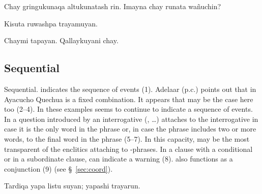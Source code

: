 %
{Chay gringukunaqa altukunatash rin. \textquestiondown{}Imayna chay runata wa\~nuchin?}%
{}%
{}{}%

%
{Kisuta ruwashpa trayamuyan.}%
{}%
{}{}%

%
{Chaymi tapayan. Qallaykuyani chay.}%
{}%
{}{}%

\subsection{Sequential }
Sequential.  indicates the sequence of events (1). Adelaar (p.c.) points out that in Ayacucho Quechua  is a fixed combination. It appears that may be the case here too (2--4). In these examples  seems to continue to indicate a sequence of events. In a question introduced by an interrogative (, \dots{})  attaches to the interrogative in case it is the only word in the phrase or, in case the phrase includes two or more words, to the final word in the phrase (5--7). In this capacity,  may be the most transparent of the enclitics attaching to -phrases. In a clause with a conditional or in a subordinate clause,  can indicate a warning (8).  also functions as a conjunction (9) (see \S~\ref{sec:coord}).

%
{Tardiqa yapa listu suyan; yapashi trayarun.}%
{}%
{}{}%

